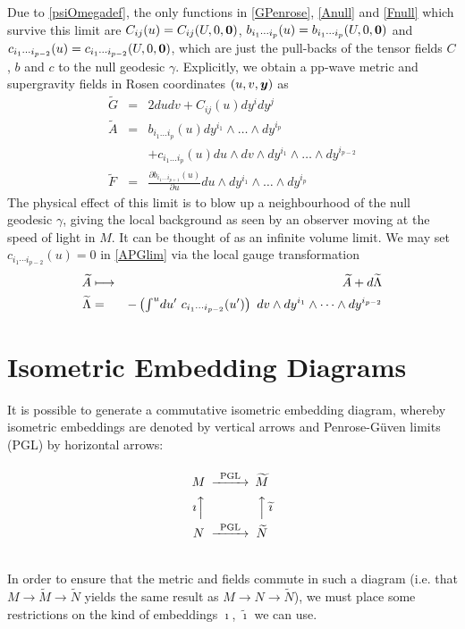 Due to \eqref{psiOmegadef}, the only functions in \eqref{GPenrose},
\eqref{Anull} and \eqref{Fnull} which survive this limit are
$C_{ij}(u)=C_{ij}(U,0,{\boldsymbol {0} })$, $b_{i_1\cdots i_p}(u)=b_{i_1\cdots
  i_p}(U,0,{\boldsymbol {0} })$ and $c_{i_1\cdots i_{p-2}}(u)=c_{i_1\cdots
  i_{p-2}}(U,0,{\boldsymbol {0} })$, which are just the pull-backs of the tensor fields $C$,
$b$ and $c$ to the null geodesic $\gamma$. Explicitly, we obtain a pp-wave
metric and supergravity fields in Rosen coordinates $(u,v,{\boldsymbol {y} })$ \cite{Rosen1}
as
\begin{eqnarray}
  \label{GPGlim}
  \widetilde{G}&=& 2dudv + C_{ij}(u)dy^i dy^j \\
  \label{APGlim}
  \widetilde{A}&=& b_{i_1\ldots i_p}(u)dy^{i_1}
  \wedge\ldots\wedge dy^{i_p} \\ \nonumber
  &&+c_{i_1\ldots i_p}(u) du\wedge
  dv\wedge dy^{i_1}\wedge\ldots\wedge dy^{i_{p-2}}\\
  \label{FPGlim}
  \widetilde{F}&=&\frac{\partial b_{i_1\ldots i_{p+1}}(u)}{\partial u}
  du\wedge dy^{i_1}\wedge\ldots\wedge dy^{i_p}
\end{eqnarray}
The physical effect of this limit is to blow up a neighbourhood of the null
geodesic $\gamma$, giving the local background as seen by an observer moving at
the speed of light in $M$. It can be thought of as an infinite volume limit. We
may set $c_{i_1\cdots i_{p-2}}(u)=0$ in \eqref{APGlim} via the local gauge
transformation
\begin{eqnarray}
  \label{APGcset0}
  \widetilde{A} &\longmapsto& \widetilde{A}+d\widetilde{\Lambda}\\\nonumber
  \widetilde{\Lambda}&=&-\left(\mbox{$\int^u$}d u'~c_{i_1\cdots
      i_{p-2}}(u')\right)~d v\wedge d y^{i_1}\wedge\cdots\wedge
  d y^{i_{p-2}}
\end{eqnarray}

\section{Isometric Embedding Diagrams}
It is possible to generate a commutative isometric embedding diagram, whereby
isometric embeddings are denoted by vertical arrows and Penrose-G\"{u}ven limits
(PGL) by horizontal arrows:
\begin{equation}
  \label{isomembdiag}
  \begin{CD}
    @.\\
    M @>\text{PGL}>>                      \widetilde{M}\\
    \text{$\imath$}@AAA @AAA\text{$\widetilde{\imath}$}\\
    N @>\text{PGL}>>                      \widetilde{N}\\
    @.
  \end{CD}
\end{equation}
In order to ensure that the metric and fields commute in such a diagram (i.e.
that $M\rightarrow \widetilde{M} \rightarrow \widetilde{N}$ yields the same
result as $M\rightarrow N\rightarrow\widetilde{N}$), we must place some
restrictions on the kind of embeddings $\imath$, $\widetilde{\imath}$ we can
use.

